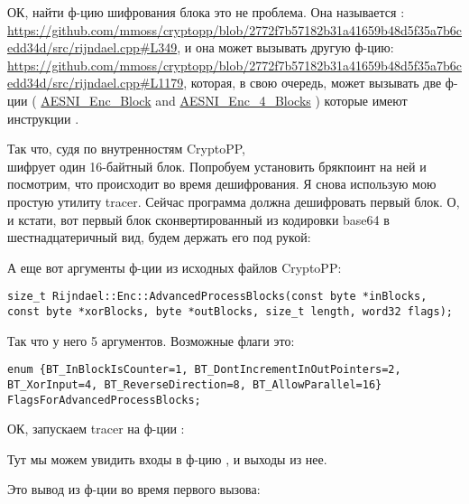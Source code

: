 ОК, найти ф-цию шифрования блока это не проблема.
Она называется :\\
\url{https://github.com/mmoss/cryptopp/blob/2772f7b57182b31a41659b48d5f35a7b6cedd34d/src/rijndael.cpp#L349},
и она может вызывать другую ф-цию: \\
\url{https://github.com/mmoss/cryptopp/blob/2772f7b57182b31a41659b48d5f35a7b6cedd34d/src/rijndael.cpp#L1179},
которая, в свою очередь, может вызывать две ф-ции (
\href{https://github.com/mmoss/cryptopp/blob/2772f7b57182b31a41659b48d5f35a7b6cedd34d/src/rijndael.cpp#L1000}{AESNI\_Enc\_Block}
and 
\href{https://github.com/mmoss/cryptopp/blob/2772f7b57182b31a41659b48d5f35a7b6cedd34d/src/rijndael.cpp#L1012}{AESNI\_Enc\_4\_Blocks}
)
которые имеют инструкции .

Так что, судя по внутренностям CryptoPP, \\
 шифрует один 16-байтный блок.
Попробуем установить брякпоинт на ней и посмотрим, что происходит во время дешифрования.
Я снова использую мою простую утилиту tracer.
Сейчас программа должна дешифровать первый блок.
О, и кстати, вот первый блок сконвертированный из кодировки base64 в шестнадцатеричный вид, будем держать его под рукой:



А еще вот аргументы ф-ции из исходных файлов CryptoPP:

\begin{lstlisting}
size_t Rijndael::Enc::AdvancedProcessBlocks(const byte *inBlocks, const byte *xorBlocks, byte *outBlocks, size_t length, word32 flags);
\end{lstlisting}

Так что у него 5 аргументов. Возможные флаги это:

\begin{lstlisting}
enum {BT_InBlockIsCounter=1, BT_DontIncrementInOutPointers=2, BT_XorInput=4, BT_ReverseDirection=8, BT_AllowParallel=16} FlagsForAdvancedProcessBlocks;
\end{lstlisting}

ОК, запускаем tracer на ф-ции :



Тут мы можем увидить входы в ф-цию , и выходы из нее.

Это вывод из ф-ции во время первого вызова:

